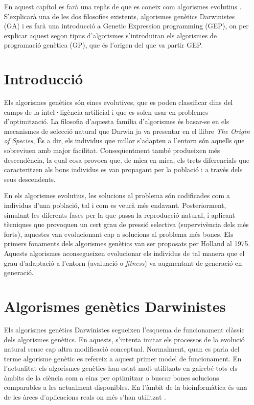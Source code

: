 %


En aquest capítol es farà una repàs de que es coneix com algorismes evolutius
\cite{H75}. S'explicarà una de les dos filosofies existents,
algorismes genètics Darwinistes (GA) i es farà una introducció a Genetic
Expression programming (GEP), on per explicar aquest segon tipus d'algorismes
s'introduiran els algorismes de programació genètica (GP), que és l'origen del
que va partir GEP.

\section{Introducció}
Els algorismes genètics són eines evolutives, que es poden
classificar dins del camps de la intel·ligència artificial i que es solen usar
en problemes d'optimització. La filosofia d'aquesta família d'algorismes és
basar-se en els mecanismes de selecció natural que Darwin ja va presentar en el
llibre \emph{The Origin of Species}, És a dir, els individus que millor
s'adapten a l'entorn són aquells que sobreviuen amb major facilitat.
Conseqüentment també produeixen més descendència, la qual cosa provoca que, de
mica en mica, els trets diferencials que caracteritzen als bons individus es van
propagant per la població i a través dels seus descendents.

En els algorismes evolutius, les solucions al problema són codificades com a
individus d'una població, tal i com es veurà més endavant. Posteriorment,
simulant les diferents fases per la que passa la reproducció natural, i aplicant
tècniques que provoquen un cert grau de pressió selectiva (supervivència dels
més forts), aquestes van evolucionant cap a solucions al problema més bones.
Els primers fonaments dels algorismes genètics van ser proposats per Holland \cite{H75} al 1975.
Aquests algorismes aconsegueixen evolucionar els individus de tal manera que el
grau d'adaptació a l'entorn (avaluació o \emph{fitness}) va augmentant de
generació en generació.

\section{Algorismes genètics Darwinistes}

Els algorismes genètics Darwinistes segueixen l'esquema de funcionament clàssic
dels algorismes genètics. En aquests, s'intenta imitar els processos de la
evolució natural sense cap altra modificació conceptual. Normalment, quan es
parla del terme algorisme genètic es refereix a aquest primer model de
funcionament. En l'actualitat els algorismes genètics han estat molt utilitzats
en gairebé tots els àmbits de la ciència com a eina per optimitzar o buscar
bones solucions comparables a les actualment disponibles. En l'àmbit de la
bioinformàtica és una de les àrees d'aplicacions reals on més s'han utilitzat
\cite{PSBE01,D96,wgl:2000,WWBG95}.

